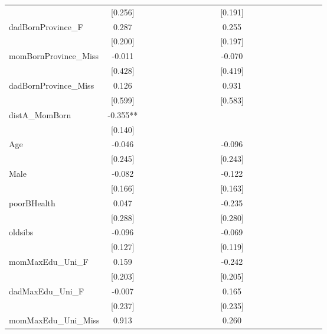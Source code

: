 \begin{tabular}{lcccccccccccccccccccc}
 & [0.256] &  &  &  &  &  &  &  &  &  & [0.191] &  &  &  &  &  &  &  &  &  \\
dadBornProvince\_F & 0.287 &  &  &  &  &  &  &  &  &  & 0.255 &  &  &  &  &  &  &  &  &  \\
 & [0.200] &  &  &  &  &  &  &  &  &  & [0.197] &  &  &  &  &  &  &  &  &  \\
momBornProvince\_Miss & -0.011 &  &  &  &  &  &  &  &  &  & -0.070 &  &  &  &  &  &  &  &  &  \\
 & [0.428] &  &  &  &  &  &  &  &  &  & [0.419] &  &  &  &  &  &  &  &  &  \\
dadBornProvince\_Miss & 0.126 &  &  &  &  &  &  &  &  &  & 0.931 &  &  &  &  &  &  &  &  &  \\
 & [0.599] &  &  &  &  &  &  &  &  &  & [0.583] &  &  &  &  &  &  &  &  &  \\
distA\_MomBorn & -0.355** &  &  &  &  &  &  &  &  &  &  &  &  &  &  &  &  &  &  &  \\
 & [0.140] &  &  &  &  &  &  &  &  &  &  &  &  &  &  &  &  &  &  &  \\
Age & -0.046 &  &  &  &  &  &  &  &  &  & -0.096 &  &  &  &  &  &  &  &  &  \\
 & [0.245] &  &  &  &  &  &  &  &  &  & [0.243] &  &  &  &  &  &  &  &  &  \\
Male & -0.082 &  &  &  &  &  &  &  &  &  & -0.122 &  &  &  &  &  &  &  &  &  \\
 & [0.166] &  &  &  &  &  &  &  &  &  & [0.163] &  &  &  &  &  &  &  &  &  \\
poorBHealth & 0.047 &  &  &  &  &  &  &  &  &  & -0.235 &  &  &  &  &  &  &  &  &  \\
 & [0.288] &  &  &  &  &  &  &  &  &  & [0.280] &  &  &  &  &  &  &  &  &  \\
oldsibs & -0.096 &  &  &  &  &  &  &  &  &  & -0.069 &  &  &  &  &  &  &  &  &  \\
 & [0.127] &  &  &  &  &  &  &  &  &  & [0.119] &  &  &  &  &  &  &  &  &  \\
momMaxEdu\_Uni\_F & 0.159 &  &  &  &  &  &  &  &  &  & -0.242 &  &  &  &  &  &  &  &  &  \\
 & [0.203] &  &  &  &  &  &  &  &  &  & [0.205] &  &  &  &  &  &  &  &  &  \\
dadMaxEdu\_Uni\_F & -0.007 &  &  &  &  &  &  &  &  &  & 0.165 &  &  &  &  &  &  &  &  &  \\
 & [0.237] &  &  &  &  &  &  &  &  &  & [0.235] &  &  &  &  &  &  &  &  &  \\
momMaxEdu\_Uni\_Miss & 0.913 &  &  &  &  &  &  &  &  &  & 0.260 &  &  &  &  &  &  &  &  &  \\

\end{tabular}
